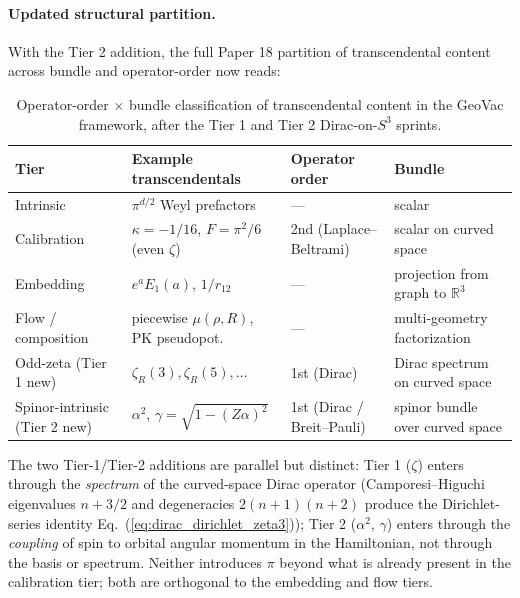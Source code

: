 \paragraph{Updated structural partition.}
With the Tier 2 addition, the full Paper 18 partition of transcendental
content across bundle and operator-order now reads:

\begin{table}[h]
\caption{Operator-order $\times$ bundle classification of transcendental
  content in the GeoVac framework, after the Tier 1 and Tier 2
  Dirac-on-$S^3$ sprints.}
\label{tab:bundle_operator_tiers}
\begin{ruledtabular}
\begin{tabular}{llll}
  Tier & Example transcendentals & Operator order & Bundle \\
  \hline
  Intrinsic         & $\pi^{d/2}$ Weyl prefactors & --- & scalar \\
  Calibration       & $\kappa = -1/16$, $F = \pi^2/6$ (even $\zeta$)
                    & 2nd (Laplace--Beltrami)
                    & scalar on curved space \\
  Embedding         & $e^a E_1(a)$,  $1/r_{12}$
                    & ---
                    & projection from graph to $\mathbb{R}^3$ \\
  Flow / composition & piecewise $\mu(\rho,R)$, PK pseudopot.
                    & ---
                    & multi-geometry factorization \\
  Odd-zeta (Tier 1 new) & $\zeta_R(3), \zeta_R(5), \dots$
                    & 1st (Dirac)
                    & Dirac spectrum on curved space \\
  Spinor-intrinsic (Tier 2 new)
                    & $\alpha^2$, $\gamma = \sqrt{1-(Z\alpha)^2}$
                    & 1st (Dirac / Breit--Pauli)
                    & spinor bundle over curved space \\
\end{tabular}
\end{ruledtabular}
\end{table}

The two Tier-1/Tier-2 additions are parallel but distinct: Tier 1
($\zeta$) enters through the \emph{spectrum} of the curved-space Dirac
operator (Camporesi--Higuchi eigenvalues $n+3/2$ and degeneracies
$2(n+1)(n+2)$ produce the Dirichlet-series identity
Eq.~(\ref{eq:dirac_dirichlet_zeta3})); Tier 2 ($\alpha^2$, $\gamma$)
enters through the \emph{coupling} of spin to orbital angular momentum
in the Hamiltonian, not through the basis or spectrum. Neither
introduces $\pi$ beyond what is already present in the calibration
tier; both are orthogonal to the embedding and flow tiers.

